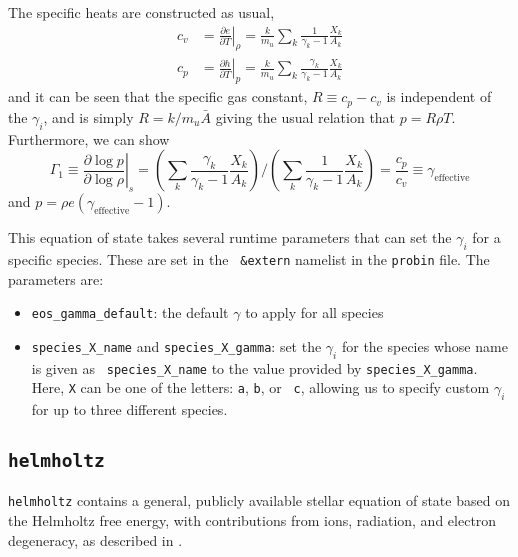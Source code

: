 The specific heats are constructed as usual,
\begin{align}
c_v &= \left . \frac{\partial e}{\partial T} \right |_\rho =
    \frac{k}{m_u} \sum_k \frac{1}{\gamma_k - 1} \frac{X_k}{A_k} \\
c_p &= \left . \frac{\partial h}{\partial T} \right |_p =
    \frac{k}{m_u} \sum_k \frac{\gamma_k}{\gamma_k - 1} \frac{X_k}{A_k}
\end{align}
and it can be seen that the specific gas constant, $R \equiv c_p -
c_v$ is independent of the $\gamma_i$, and is simply $R =
k/m_u\bar{A}$ giving the usual relation that $p = R\rho T$.
Furthermore, we can show
\begin{equation}
\Gamma_1 \equiv \left . \frac{\partial \log p}{\partial \log \rho} \right |_s =
   \left ( \sum_k \frac{\gamma_k}{\gamma_k - 1} \frac{X_k}{A_k} \right ) \bigg /
   \left ( \sum_k \frac{1}{\gamma_k - 1} \frac{X_k}{A_k} \right ) =
\frac{c_p}{c_v} \equiv \gamma_\mathrm{effective}
\end{equation}
and $p = \rho e (\gamma_\mathrm{effective} - 1)$.

This equation of state takes several runtime parameters that can set
the $\gamma_i$ for a specific species.  These are set in the {\tt
  \&extern} namelist in the {\tt probin} file.  The parameters are:
\begin{itemize}
\item {\tt eos\_gamma\_default}: the default $\gamma$ to apply for all
  species
\item {\tt species\_X\_name} and {\tt species\_X\_gamma}: set the
  $\gamma_i$ for the species whose name is given as {\tt
  species\_X\_name} to the value provided by {\tt species\_X\_gamma}.
  Here, {\tt X} can be one of the letters: {\tt a}, {\tt b}, or {\tt
    c}, allowing us to specify custom $\gamma_i$ for up to three
  different species.
\end{itemize}

\subsection {\tt helmholtz}

{\tt helmholtz} contains a general, publicly available stellar
  equation of state based on the Helmholtz free energy, with
  contributions from ions, radiation, and electron degeneracy, as
  described in \cite{timmes:1999,timmes:2000,flash}.

